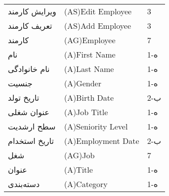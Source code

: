 \documentclass[12pt]{article}
\begin{document}
\begin{table}[]
\begin{tabular}{lll}
			ویرایش کارمند                        & (AS)Edit Employee                                                                                             & 3     \\
			تعریف کارمند                         & (AS)Add Employee                                                                                              & 3     \\
			کارمند                               & (AG)Employee                                                                                                  & 7     \\
			نام                                  & (A)First Name                                                                                                 & 1-ه   \\
			نام خانوادگی                         & (A)Last Name                                                                                                  & 1-ه   \\
			جنسیت                                & (A)Gender                                                                                                     & 1-ه   \\
			تاریخ تولد                           & (A)Birth Date                                                                                                 & 2-ب   \\
			عنوان شغلی                           & (A)Job Title                                                                                                  & 1-ه   \\
			سطح ارشدیت                           & (A)Seniority Level                                                                                            & 1-ه   \\
			تاریخ استخدام                        & (A)Employment Date                                                                                            & 2-ب   \\
			شغل                                  & (AG)Job                                                                                                       & 7     \\
			عنوان                                & (A)Title                                                                                                      & 1-ه   \\
			دسته‌بندی                            & (A)Category                                                                                                   & 1-ه  
		\end{tabular}
	\end{table}
	
\end{document}
